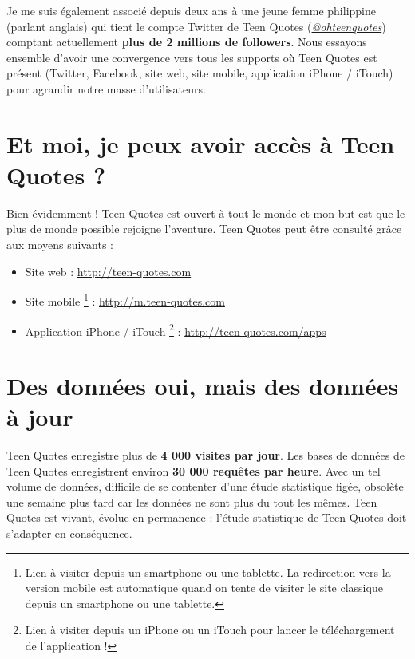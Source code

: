 \documentclass{report}
\begin{document}
	Je me suis également associé depuis deux ans à une jeune femme philippine (parlant anglais) qui tient le compte Twitter de Teen Quotes (\href{http://twitter.com/ohteenquotes}{\textit{@ohteenquotes}}) comptant actuellement \textbf{plus de 2 millions de followers}. Nous essayons ensemble d'avoir une convergence vers tous les supports où Teen Quotes est présent (Twitter, Facebook, site web, site mobile, application iPhone / iTouch) pour agrandir notre masse d'utilisateurs.

	\section{Et moi, je peux avoir accès à Teen Quotes ?}
	Bien évidemment ! Teen Quotes est ouvert à tout le monde et mon but est que le plus de monde possible rejoigne l'aventure. Teen Quotes peut être consulté grâce aux moyens suivants :
	\vspace{10px}
	\begin{itemize}
		\item Site web : \url{http://teen-quotes.com}
		\item Site mobile \footnote{Lien à visiter depuis un smartphone ou une tablette. La redirection vers la version mobile est automatique quand on tente de visiter le site classique depuis un smartphone ou une tablette.} : \url{http://m.teen-quotes.com}
		\item Application iPhone / iTouch \footnote{Lien à visiter depuis un iPhone ou un iTouch pour lancer le téléchargement de l'application !} : \url{http://teen-quotes.com/apps}
	\end{itemize}

	\section{Des données oui, mais des données à jour}
	Teen Quotes enregistre plus de \textbf{4 000 visites par jour}. Les bases de données de Teen Quotes enregistrent environ \textbf{30 000 requêtes par heure}. Avec un tel volume de données, difficile de se contenter d'une étude statistique figée, obsolète une semaine plus tard car les données ne sont plus du tout les mêmes. Teen Quotes est vivant, évolue en permanence : l'étude statistique de Teen Quotes doit s'adapter en conséquence.\\
\end{document}
